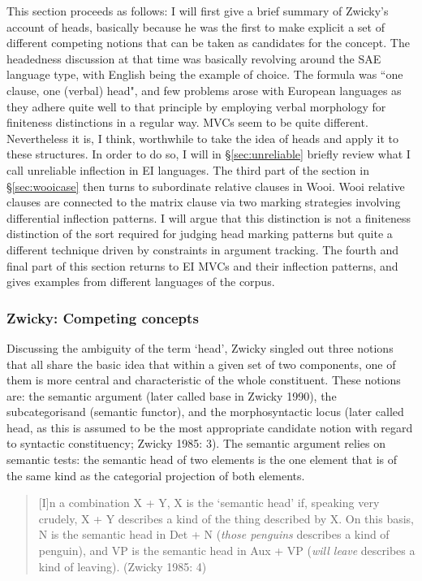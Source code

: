 This section proceeds as follows: I will first give a brief summary of Zwicky's account of heads, basically because he was the first to make explicit a set of different competing notions that can be taken as candidates for the concept. The headedness discussion at that time was basically revolving around the \acs{SAE} language type, with English being the example of choice. The formula was ``one clause, one (verbal) head", and few problems arose with European languages as they adhere quite well to that principle by employing verbal morphology for finiteness distinctions in a regular way. MVCs seem to be quite different. Nevertheless it is, I think, worthwhile to take the idea of heads and apply it to these structures. In order to do so, I will in §\ref{sec:unreliable} briefly review what I call unreliable inflection in EI languages. The third part of the section in §\ref{sec:wooicase} then turns to subordinate relative clauses in Wooi. Wooi relative clauses are connected to the matrix clause via two marking strategies involving differential inflection patterns. I will argue that this distinction is not a finiteness distinction of the sort required for judging head marking patterns but quite a different technique driven by constraints in argument tracking. The fourth and final part of this section returns to EI MVCs and their inflection patterns, and gives examples from different languages of the corpus.

\subsubsection{Zwicky: Competing concepts}\label{sec:Zwicky}

Discussing the ambiguity of the term `head', Zwicky singled out three notions that all share the basic idea that within a given set of two components, one of them is more central and characteristic of the whole constituent. These notions are: the semantic argument (later called base in Zwicky 1990), the subcategorisand (semantic functor), and the morphosyntactic locus (later called head, as this is assumed to be the most appropriate candidate notion with regard to syntactic constituency; Zwicky 1985: 3). The semantic argument relies on semantic tests: the semantic head of two elements is the one element that is of the same kind as the categorial projection of both elements.

\begin{quote}
[I]n a combination X + Y, X is the `semantic head' if, speaking very crudely, X + Y describes a kind of the thing described by X. On this basis, N is the semantic head in Det + N (\textit{those penguins} describes a kind of penguin), and VP is the semantic head in Aux + VP (\textit{will leave} describes a kind of leaving). (Zwicky 1985: 4)
\end{quote}

